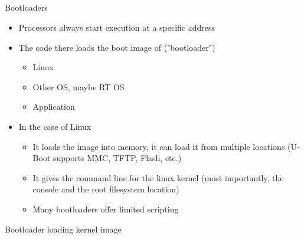 \documentclass{workshop}
\begin{document}
\subsection{}
\begin{frame}{Bootloaders}
	\begin{itemize}
		\item Processors always start execution at a specific address
		\item The code there loads the boot image of ("bootloader")
			\begin{itemize}
				\item Linux
				\item Other OS, maybe RT OS
				\item Application
			\end{itemize}

		\item In the case of Linux
			\begin{itemize}
				\item It loads the image into memory, it can load it from multiple locations (U-Boot supports MMC, TFTP, Flash, etc.)
				\item It gives the command line for the linux kernel (most importantly, the console and the root filesystem location)
				\item Many bootloaders offer limited scripting 
			\end{itemize}
	\end{itemize}
\end{frame}

\begin{frame}{Bootloader loading kernel image}

\end{frame}
\end{document}

